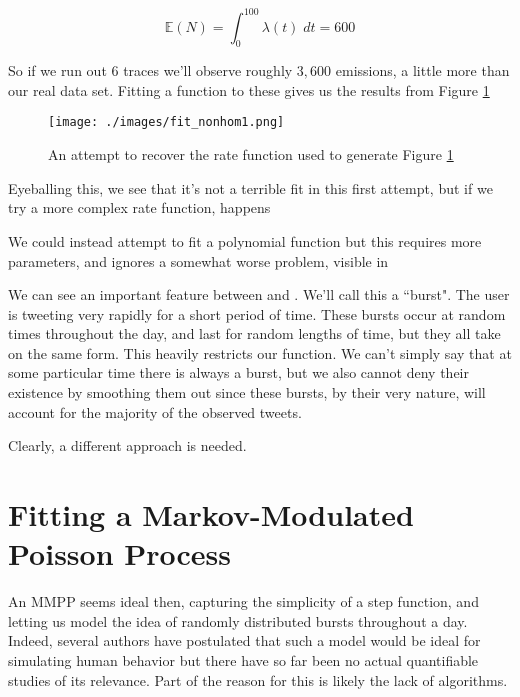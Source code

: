 $$
\mathbb{E}(N) = \int^{100}_0 \lambda(t) \; dt = 600
$$

So if we run out 6 traces we'll observe roughly $3,600$ emissions, a little more than our real data set. Fitting a function to these gives us the results from Figure \ref{fit_nonhom1}

\begin{figure}[h]
\texttt{[image: ./images/fit\_nonhom1.png]}
\caption{An attempt to recover the rate function used to generate Figure \ref{fit_nonhom1}}
\label{fit_nonhom1}
\end{figure}

Eyeballing this, we see that it's not a terrible fit in this first attempt, but if we try a more complex rate function, %
happens


We could instead attempt to fit a polynomial function but this requires more parameters, and ignores a somewhat worse problem, visible in %


We can see an important feature between 
and
. We'll call this a ``burst". The user is tweeting very rapidly for a short period of time. These bursts occur at random times throughout the day, and last for random lengths of time, but they all take on the same form. This heavily restricts our function. We can't simply say that at some particular time there is always a burst, but we also cannot deny their existence by smoothing them out since these bursts, by their very nature, will account for the majority of the observed tweets.

Clearly, a different approach is needed.

\section{Fitting a Markov-Modulated Poisson Process}

An MMPP seems ideal then, capturing the simplicity of a step function, and letting us model the idea of randomly distributed bursts throughout a day. Indeed, several authors have postulated that such a model would be ideal for simulating human behavior %
but there have so far been no actual quantifiable studies of its relevance. Part of the reason for this is likely the lack of algorithms.

